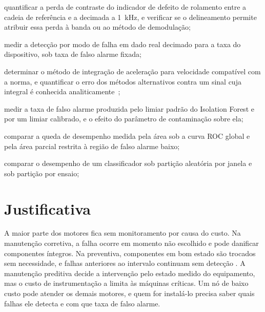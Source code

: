 \begin{alineas}
    \item quantificar a perda de contraste do indicador de defeito de rolamento entre a
          cadeia de referência e a decimada a \SI{1}{\kilo\hertz}, e verificar se o delineamento
          permite atribuir essa perda à banda ou ao método de demodulação;

    \item medir a detecção por modo de falha em dado real decimado para a taxa do
          dispositivo, sob taxa de falso alarme fixada;

    \item determinar o método de integração de aceleração para velocidade compatível com a
          norma, e quantificar o erro dos métodos alternativos contra um sinal cuja
          integral é conhecida analiticamente~\cite{brandt2014,iso208163_2022};

    \item medir a taxa de falso alarme produzida pelo limiar padrão do Isolation Forest e
          por um limiar calibrado, e o efeito do parâmetro de contaminação sobre ela;

    \item comparar a queda de desempenho medida pela área sob a curva ROC global e pela
          área parcial restrita à região de falso alarme baixo;

    \item comparar o desempenho de um classificador sob partição aleatória por janela e sob
          partição por ensaio;

    \item {}
\end{alineas}

\section{Justificativa}
\label{sec:intro-justificativa}

A maior parte dos motores fica sem monitoramento por causa do custo. Na manutenção corretiva, a falha ocorre em momento não escolhido e pode danificar componentes
íntegros. Na preventiva, componentes em bom estado são trocados sem necessidade, e falhas
anteriores ao intervalo continuam sem detecção \cite{mobley2002}. A manutenção preditiva
decide a intervenção pelo estado medido do equipamento, mas o custo de instrumentação a
limita às máquinas críticas. Um nó de baixo custo pode atender os demais motores, e quem
for instalá-lo precisa saber quais falhas ele detecta e com que taxa de falso alarme.

